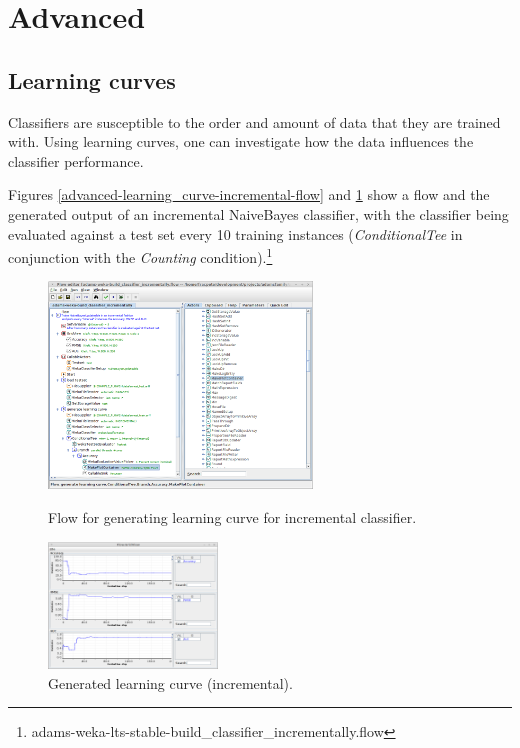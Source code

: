 \newpage
\section{Advanced}

\subsection{Learning curves}
Classifiers are susceptible to the order and amount of data that they are
trained with. Using learning curves, one can investigate how the data
influences the classifier performance.

Figures \ref{advanced-learning_curve-incremental-flow} and \ref{advanced-learning_curve-incremental-output}
show a flow and the generated output of an incremental NaiveBayes classifier, 
with the classifier being evaluated against a test set every 10 training 
instances (\textit{ConditionalTee} in conjunction with the \textit{Counting}
condition).\footnote{adams-weka-lts-stable-build\_classifier\_incrementally.flow}

\begin{figure}[ht]
  \begin{minipage}[t]{0.55\linewidth}
    \centering
    \includegraphics[width=7.0cm]{images/advanced-learning_curve-incremental-flow.png}
    \caption{Flow for generating learning curve for incremental classifier.}
    \label{advanced-learning_curve-incremental-flow}
  \end{minipage}
  \hspace{0.5cm}
  \begin{minipage}[t]{0.45\linewidth}
    \centering
    \includegraphics[width=4.5cm]{images/advanced-learning_curve-incremental-output.png}
    \caption{Generated learning curve (incremental).}
    \label{advanced-learning_curve-incremental-output}
  \end{minipage}
\end{figure}


